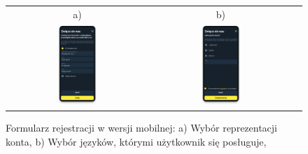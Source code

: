 \begin{figure}[H]
 \centering
  \begin{tabular}{@{}ccc@{}}
  a) & b)\\
  \includegraphics[width=0.3\textwidth]{rozdzial1/wybor_2_m.png} &
  \includegraphics[width=0.3\textwidth]{rozdzial1/wybor_3_m.png}
  \end{tabular}
 \caption{Formularz rejestracji w wersji mobilnej: a) Wybór reprezentacji konta, b) Wybór języków, którymi użytkownik się posługuje, }
 \label{fig:Formularz rejestracji - ab2 - mobile}
\end{figure}
